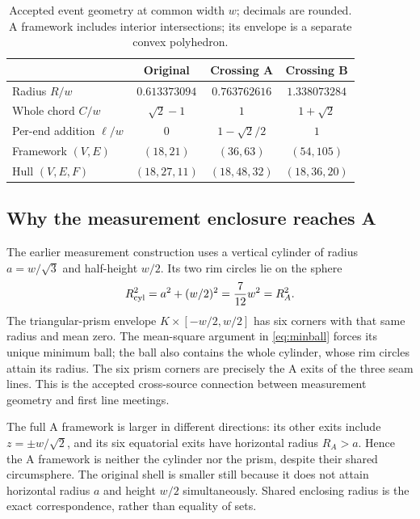 \documentclass[11pt,a4paper]{article}
\begin{document}
\begin{table}[htbp]\centering\small
\caption{Accepted event geometry at common width $w$; decimals are rounded. A framework includes interior intersections; its envelope is a separate convex polyhedron.}\label{tab:events}
\begin{tabular}{@{}lccc@{}}\toprule
 & Original & Crossing A & Crossing B\\\midrule
Radius $R/w$ & $0.613373094$ & $0.763762616$ & $1.338073284$\\
Whole chord $C/w$ & $\sqrt2-1$ & $1$ & $1+\sqrt2$\\
Per-end addition $\ell/w$ & $0$ & $1-\sqrt2/2$ & $1$\\
Framework $(V,E)$ & $(18,21)$ & $(36,63)$ & $(54,105)$\\
Hull $(V,E,F)$ & $(18,27,11)$ & $(18,48,32)$ & $(18,36,20)$\\\bottomrule
\end{tabular}
\end{table}

\subsection{Why the measurement enclosure reaches A}
The earlier measurement construction uses a vertical cylinder of radius $a=w/\sqrt3$ and half-height $w/2$. Its two rim circles lie on the sphere
\begin{equation}\label{eq:cylinder}
R_{\rm cyl}^2=a^2+(w/2)^2=\frac7{12}w^2=R_A^2.
\end{equation}
The triangular-prism envelope $K\times[-w/2,w/2]$ has six corners with that same radius and mean zero. The mean-square argument in \eqref{eq:minball} forces its unique minimum ball; the ball also contains the whole cylinder, whose rim circles attain its radius. The six prism corners are precisely the A exits of the three seam lines. This is the accepted cross-source connection between measurement geometry and first line meetings.~\cite{TSZSphere,TSZReview}

The full A framework is larger in different directions: its other exits include $z=\pm w/\sqrt2$, and its six equatorial exits have horizontal radius $R_A>a$. Hence the A framework is neither the cylinder nor the prism, despite their shared circumsphere. The original shell is smaller still because it does not attain horizontal radius $a$ and height $w/2$ simultaneously. Shared enclosing radius is the exact correspondence, rather than equality of sets.
\end{document}

